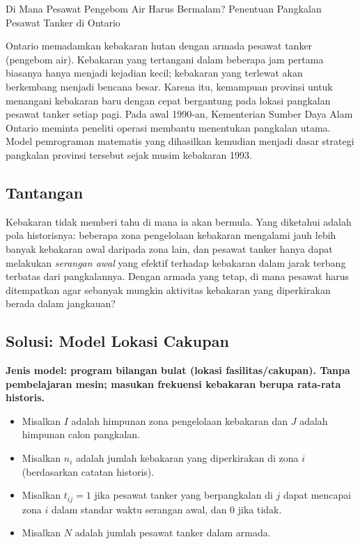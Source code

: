 \begin{casestudybox}{Di Mana Pesawat Pengebom Air Harus Bermalam? Penentuan Pangkalan Pesawat Tanker di Ontario}
\label{case:wildfire-airtankers}

Ontario memadamkan kebakaran hutan dengan armada pesawat tanker (pengebom air). Kebakaran yang tertangani dalam beberapa jam pertama biasanya hanya menjadi kejadian kecil; kebakaran yang terlewat akan berkembang menjadi bencana besar. Karena itu, kemampuan provinsi untuk menangani kebakaran baru dengan cepat bergantung pada lokasi pangkalan pesawat tanker setiap pagi. Pada awal 1990-an, Kementerian Sumber Daya Alam Ontario meminta peneliti operasi membantu menentukan pangkalan utama. Model pemrograman matematis yang dihasilkan kemudian menjadi dasar strategi pangkalan provinsi tersebut sejak musim kebakaran 1993.

\subsection*{Tantangan}
Kebakaran tidak memberi tahu di mana ia akan bermula. Yang diketahui adalah pola historisnya: beberapa zona pengelolaan kebakaran mengalami jauh lebih banyak kebakaran awal daripada zona lain, dan pesawat tanker hanya dapat melakukan \emph{serangan awal} yang efektif terhadap kebakaran dalam jarak terbang terbatas dari pangkalannya. Dengan armada yang tetap, di mana pesawat harus ditempatkan agar sebanyak mungkin aktivitas kebakaran yang diperkirakan berada dalam jangkauan?

\subsection*{Solusi: Model Lokasi Cakupan}
\textbf{Jenis model: program bilangan bulat (lokasi fasilitas/cakupan). Tanpa pembelajaran mesin; masukan frekuensi kebakaran berupa rata-rata historis.}

\begin{itemize}
\item Misalkan $I$ adalah himpunan zona pengelolaan kebakaran dan $J$ adalah himpunan calon pangkalan.
\item Misalkan $n_i$ adalah jumlah kebakaran yang diperkirakan di zona $i$ (berdasarkan catatan historis).
\item Misalkan $t_{ij} = 1$ jika pesawat tanker yang berpangkalan di $j$ dapat mencapai zona $i$ dalam standar waktu serangan awal, dan $0$ jika tidak.
\item Misalkan $N$ adalah jumlah pesawat tanker dalam armada.
\end{itemize}


\end{casestudybox}
